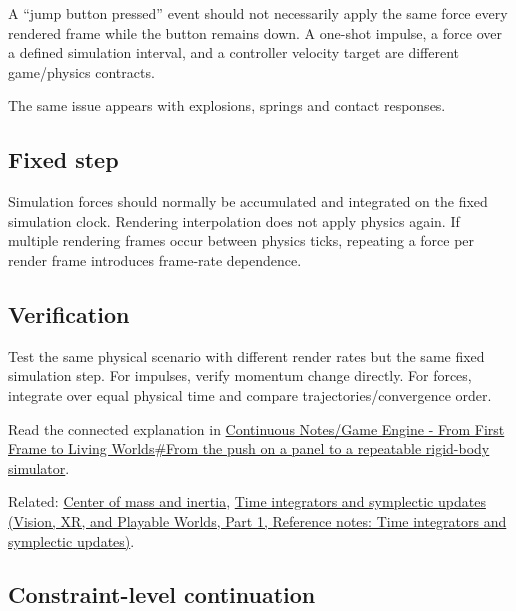 \hypertarget{appendix-c39931e6e4c2-frame-event-versus-physical-force}{}

A ``jump button pressed'' event should not necessarily apply the same force every rendered frame while the button remains down. A one-shot impulse, a force over a defined simulation interval, and a controller velocity target are different game/physics contracts.

The same issue appears with explosions, springs and contact responses.

\subsection{Fixed step}\label{appendix-c39931e6e4c2-fixed-step}

\hypertarget{appendix-c39931e6e4c2-fixed-step}{}

Simulation forces should normally be accumulated and integrated on the fixed simulation clock. Rendering interpolation does not apply physics again. If multiple rendering frames occur between physics ticks, repeating a force per render frame introduces frame-rate dependence.

\subsection{Verification}\label{appendix-c39931e6e4c2-verification}

\hypertarget{appendix-c39931e6e4c2-verification}{}

Test the same physical scenario with different render rates but the same fixed simulation step. For impulses, verify momentum change directly. For forces, integrate over equal physical time and compare trajectories/convergence order.

Read the connected explanation in \hyperref[06-engine-ii-ch034-from-the-push-on-a-panel-to-a-repeatable-rigid-body-simulator]{Continuous Notes/Game Engine - From First Frame to Living Worlds\#From the push on a panel to a repeatable rigid-body simulator}.

Related: \hyperref[appendix-66742099f8a0]{Center of mass and inertia}, \href{../07-Vision-XR-and-Playable-Worlds-P01/main.pdf\#appendix-8f96f9c4d5bc}{Time integrators and symplectic updates (Vision, XR, and Playable Worlds, Part 1, Reference notes: Time integrators and symplectic updates)}.

\subsection{Constraint-level continuation}\label{appendix-c39931e6e4c2-constraint-level-continuation}

